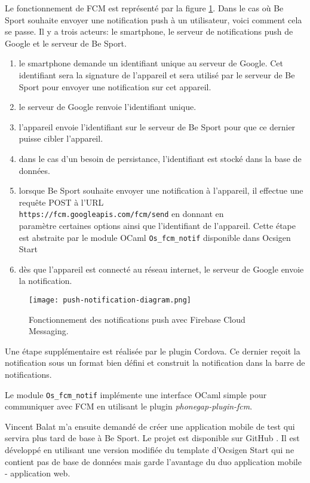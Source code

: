 Le fonctionnement de FCM est représenté par la figure
\ref{fig:push_notification_fcm_explanation}. Dans le cas où Be Sport souhaite
envoyer une notification push à un utilisateur, voici comment cela se passe.
Il y a trois acteurs: le smartphone, le serveur de notifications push de Google
et le serveur de Be Sport.

\begin{enumerate}
  \item le smartphone demande un identifiant unique au serveur de Google. Cet
    identifiant sera la signature de l'appareil et sera utilisé par le serveur
    de Be Sport pour envoyer une notification sur cet appareil.
  \item le serveur de Google renvoie l'identifiant unique.
  \item l'appareil envoie l'identifiant sur le serveur de Be Sport pour que ce
    dernier puisse cibler l'appareil.
  \item dans le cas d'un besoin de persistance, l'identifiant est stocké dans la base de données.
  \item lorsque Be Sport souhaite envoyer une notification à l'appareil, il
    effectue une requête POST à l'URL \\ \verb|https://fcm.googleapis.com/fcm/send|
    en donnant en \\ paramètre certaines options ainsi que l'identifiant de
    l'appareil. Cette étape est abstraite par le module OCaml
    \verb|Os_fcm_notif| disponible dans Ocsigen Start
  \item dès que l'appareil est connecté au réseau internet, le serveur de Google
    envoie la notification.
\end{enumerate}

\begin{figure}
  \centering
  \texttt{[image: push-notification-diagram.png]}
  \caption{Fonctionnement des notifications push avec Firebase Cloud Messaging.}
  \label{fig:push_notification_fcm_explanation}
\end{figure}

Une étape supplémentaire est réalisée par le plugin Cordova. Ce dernier reçoit
la notification sous un format bien défini et construit la notification dans la
barre de notifications.

Le module \verb|Os_fcm_notif| implémente une interface OCaml simple pour
communiquer avec FCM en utilisant le plugin \emph{phonegap-plugin-fcm}.

Vincent Balat m'a ensuite demandé de créer une application mobile de test qui
servira plus tard de base à Be Sport.
Le projet est disponible sur GitHub \cite{ocsigen-mobile-push-notifications}. Il
est développé en utilisant une version modifiée du template d'Ocsigen Start qui
ne contient pas de base de données mais garde l'avantage du duo application
mobile - application web.

